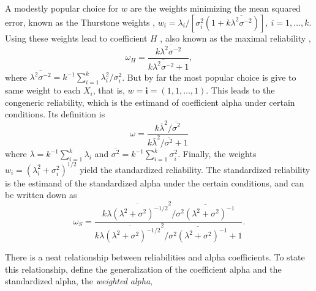 \documentclass[twoside]{article}
\renewcommand{\sqrt}[1]{{(#1)^{1/2}}}
\begin{document}
A modestly popular choice for $w$ are the weights minimizing the mean squared error, known as the Thurstone weights \citep{thurshronebook}, $w_{i}=\lambda_{i}/[\sigma_{i}^{2}(1+k\overline{\lambda^{2}\sigma^{-2}})],\:i=1,\ldots,k$. Using these weights lead to coefficient $H$ \citep{hancock2001rethinking}, also known as the maximal reliability \citep{Li1997-yh}, 
\begin{equation}
\label{eq:coefficient_H}
\omega_{H}=\frac{k\overline{\lambda^{2}\sigma^{-2}}}{k\overline{\lambda^{2}\sigma^{-2}}+1},
\end{equation}
where $\overline{\lambda^{2}\sigma^{-2}} = k^{-1}\sum_{i=1}^{k}\lambda_{i}^2/\sigma_i^2$. But by far the most popular choice is give to same weight to each $X_i$, that is, $w = \mathbf{i}=(1,1,\ldots,1)$. This leads to the congeneric reliability, which is the estimand of coefficient alpha under certain conditions. Its definition is
\begin{equation}
\omega =\frac{k\overline{\lambda}^{2}/\overline{\sigma^{2}}}{k\overline{\lambda}^{2}/\overline{\sigma^{2}} + 1}\label{eq:Congeneric reliability}
\end{equation}
where $\overline{\lambda}=k^{-1}\sum_{i=1}^{k}\lambda_{i}$ and
$\overline{\sigma^{2}}=k^{-1}\sum_{i=1}^{k}\sigma_{i}^{2}$. Finally, the weights $w_i = \sqrt{\lambda_i^2 + \sigma_i^2}$ yield the standardized reliability. The standardized reliability is the estimand of the standardized alpha under the certain conditions, and can be written down as
\begin{equation}
\omega_S=\frac{k\overline{\lambda(\lambda^{2}+\sigma^{2})^{-1/2}}^{2}/\overline{\sigma^{2}(\lambda^{2}+\sigma^{2})^{-1}}}{k\overline{\lambda(\lambda^{2}+\sigma^{2})^{-1/2}}^{2}/\overline{\sigma^{2}(\lambda^{2}+\sigma^{2})^{-1}}+1}.\label{eq:Standardized reliability}
\end{equation}

There is a neat relationship between reliabilities and alpha coefficients. To state this relationship, define the generalization of the coefficient alpha and the standardized alpha, the \textit{weighted alpha},
\end{document}
